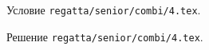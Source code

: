 \problem
Условие \texttt{regatta/senior/combi/4.tex}.

\solution Решение \texttt{regatta/senior/combi/4.tex}.
\endproblem
